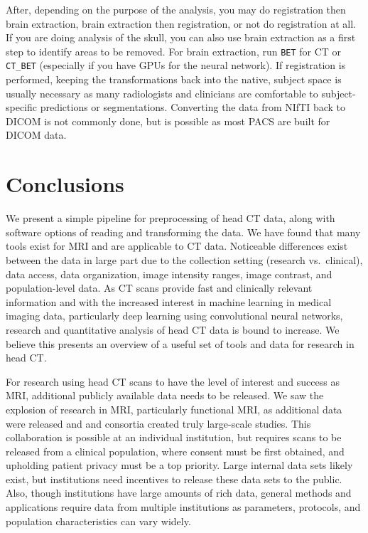 \documentclass[]{elsarticle} %
\begin{document}
After, depending on the purpose of the analysis, you may do registration then brain extraction, brain extraction then registration, or not do registration at all. If you are doing analysis of the skull, you can also use brain extraction as a first step to identify areas to be removed. For brain extraction, run \texttt{BET} for CT or \texttt{CT\_BET} (especially if you have GPUs for the neural network). If registration is performed, keeping the transformations back into the native, subject space is usually necessary as many radiologists and clinicians are comfortable to subject-specific predictions or segmentations. Converting the data from NIfTI back to DICOM is not commonly done, but is possible as most PACS are built for DICOM data.

\hypertarget{conclusions}{%
\section{Conclusions}\label{conclusions}}

We present a simple pipeline for preprocessing of head CT data, along with software options of reading and transforming the data. We have found that many tools exist for MRI and are applicable to CT data. Noticeable differences exist between the data in large part due to the collection setting (research vs.~clinical), data access, data organization, image intensity ranges, image contrast, and population-level data. As CT scans provide fast and clinically relevant information and with the increased interest in machine learning in medical imaging data, particularly deep learning using convolutional neural networks, research and quantitative analysis of head CT data is bound to increase. We believe this presents an overview of a useful set of tools and data for research in head CT.

For research using head CT scans to have the level of interest and success as MRI, additional publicly available data needs to be released. We saw the explosion of research in MRI, particularly functional MRI, as additional data were released and and consortia created truly large-scale studies. This collaboration is possible at an individual institution, but requires scans to be released from a clinical population, where consent must be first obtained, and upholding patient privacy must be a top priority. Large internal data sets likely exist, but institutions need incentives to release these data sets to the public. Also, though institutions have large amounts of rich data, general methods and applications require data from multiple institutions as parameters, protocols, and population characteristics can vary widely.
\end{document}
